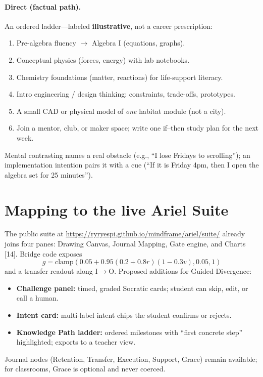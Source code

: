 \documentclass[11pt, a4paper]{article}
\begin{document}
\paragraph{Direct (factual path).} An ordered ladder---labeled \textbf{illustrative}, not a career prescription:
\begin{enumerate}[leftmargin=1.6em]
  \item Pre-algebra fluency $\rightarrow$ Algebra I (equations, graphs).
  \item Conceptual physics (forces, energy) with lab notebooks.
  \item Chemistry foundations (matter, reactions) for life-support literacy.
  \item Intro engineering / design thinking: constraints, trade-offs, prototypes.
  \item A small CAD or physical model of \emph{one} habitat module (not a city).
  \item Join a mentor, club, or maker space; write one if--then study plan for the next week.
\end{enumerate}
Mental contrasting names a real obstacle (e.g., ``I lose Fridays to scrolling''); an implementation intention pairs it with a cue (``If it is Friday 4pm, then I open the algebra set for 25 minutes'').

\section{Mapping to the live Ariel Suite}
The public suite at \url{https://ryryespi.github.io/mindframe/ariel/suite/} already joins four panes: Drawing Canvas, Journal Mapping, Gate engine, and Charts [14]. Bridge code exposes
\[
g=\mathrm{clamp}(0.05+0.95(0.2+0.8r)(1-0.3v),0.05,1)
\]
and a transfer readout along I$\rightarrow$O. Proposed additions for Guided Divergence:
\begin{itemize}[leftmargin=1.4em]
  \item \textbf{Challenge panel:} timed, graded Socratic cards; student can skip, edit, or call a human.
  \item \textbf{Intent card:} multi-label intent chips the student confirms or rejects.
  \item \textbf{Knowledge Path ladder:} ordered milestones with ``first concrete step'' highlighted; exports to a teacher view.
\end{itemize}
Journal nodes (Retention, Transfer, Execution, Support, Grace) remain available; for classrooms, Grace is optional and never coerced.
\end{document}
